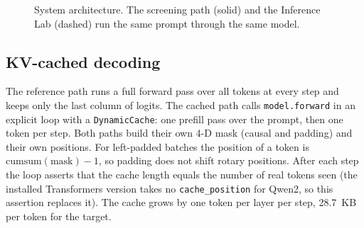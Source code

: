 \documentclass[conference]{IEEEtran}
\begin{document}
\begin{figure}[t]
\centering
{}
\caption{System architecture. The screening path (solid) and the Inference Lab (dashed) run the same prompt through the same model.}
\label{fig:arch}
\end{figure}

\subsection{KV-cached decoding}
The reference path runs a full forward pass over all tokens at every step and keeps only the last column of logits. The cached path calls \texttt{model.forward} in an explicit loop with a \texttt{DynamicCache}: one prefill pass over the prompt, then one token per step. Both paths build their own 4-D mask (causal and padding) and their own positions. For left-padded batches the position of a token is $\mathrm{cumsum}(\text{mask})-1$, so padding does not shift rotary positions. After each step the loop asserts that the cache length equals the number of real tokens seen (the installed Transformers version takes no \texttt{cache\_position} for Qwen2, so this assertion replaces it). The cache grows by one token per layer per step, 28.7~KB per token for the target.
\end{document}
